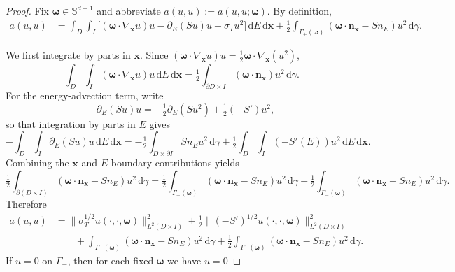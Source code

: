 \documentclass[10pt,a4paper]{amsart}
\renewcommand{\d}{\ensuremath{\,\mathrm{d}}}
\newcommand{\qp}[1]{\ensuremath{\!\left({#1}\right)}}
\renewcommand{\vec}[1]{\ensuremath{\boldsymbol{#1}}}
\begin{document}
\begin{proof}
Fix $\vec{\omega}\in\mathbb{S}^{d-1}$ and abbreviate
$a(u,u):=a(u,u;\vec{\omega})$. By definition,
\begin{align*}
  a(u,u)
  &=
  \int_D \int_I
  \Big[\qp{\vec{\omega}\cdot\nabla_{\vec x} u} u
  - \partial_E\qp{S u} u
  + \sigma_T u^2\Big]\d E \d\vec{x}
  + \tfrac{1}{2}\int_{\Gamma_+(\vec\omega)}\qp{\vec{\omega}\cdot\vec{n}_{\vec x} - S n_E} u^2 \d\gamma.
\end{align*}

We first integrate by parts in $\vec{x}$. Since
$\qp{\vec{\omega}\cdot\nabla_{\vec x} u} u = \tfrac{1}{2}\vec{\omega}\cdot\nabla_{\vec x}\qp{u^2}$,
\begin{equation*}
  \int_D \int_I \qp{\vec{\omega}\cdot\nabla_{\vec x} u} u \d E \d\vec{x}
  =
  \tfrac{1}{2}\int_{\partial D\times I}\qp{\vec{\omega}\cdot\vec{n}_{\vec x}} u^2 \d\gamma.
\end{equation*}
For the energy-advection term, write
\begin{equation*}
  -\partial_E\qp{S u} u
  =
  -\tfrac{1}{2}\partial_E\qp{S u^2} + \tfrac{1}{2}\qp{-S'} u^2,
\end{equation*}
so that integration by parts in $E$ gives
\begin{equation*}
  -\int_D \int_I \partial_E\qp{S u} u \d E \d\vec{x}
  =
  -\tfrac{1}{2}\int_{D\times\partial I} S n_E u^2 \d\gamma
  + \tfrac{1}{2}\int_D \int_I \qp{-S'(E)} u^2 \d E \d\vec{x}.
\end{equation*}
Combining the $\vec{x}$ and $E$ boundary contributions yields
\begin{equation*}
  \tfrac{1}{2}\int_{\partial(D\times I)}
  \qp{\vec{\omega}\cdot\vec{n}_{\vec x} - S n_E} u^2 \d\gamma
  =
  \tfrac{1}{2}\int_{\Gamma_+(\vec\omega)}\qp{\vec{\omega}\cdot\vec{n}_{\vec x} - S n_E} u^2 \d\gamma
  + \tfrac{1}{2}\int_{\Gamma_-(\vec\omega)}\qp{\vec{\omega}\cdot\vec{n}_{\vec x} - S n_E} u^2 \d\gamma.
\end{equation*}
Therefore
\begin{align*}
  a(u,u)
  &=
  \|\sigma_T^{1/2}u(\cdot,\cdot,\vec\omega)\|_{L^2(D\times I)}^2
  + \tfrac{1}{2}\|(-S')^{1/2}u(\cdot,\cdot,\vec\omega)\|_{L^2(D\times I)}^2
  \\
  &\qquad + \int_{\Gamma_+(\vec\omega)}\qp{\vec{\omega}\cdot\vec{n}_{\vec x} - S n_E} u^2 \d\gamma
  + \tfrac{1}{2}\int_{\Gamma_-(\vec\omega)}\qp{\vec{\omega}\cdot\vec{n}_{\vec x} - S n_E} u^2 \d\gamma.
\end{align*}
If $u=0$ on $\Gamma_-$, then for each fixed $\vec\omega$ we have $u=0$

\end{proof}
\end{document}
